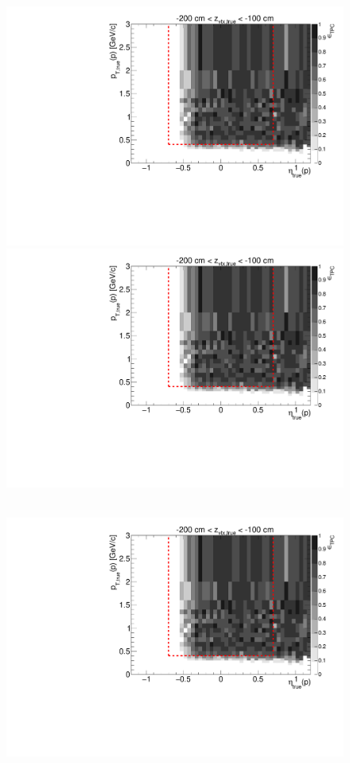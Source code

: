 \begin{figure}[hb]
{  \includegraphics[width=\linewidth,page=7]{graphics/eff/Eff2D_TPC_proton_Plus.pdf}\\
  \includegraphics[width=\linewidth,page=9]{graphics/eff/Eff2D_TPC_proton_Plus.pdf}
}~
\parbox{0.495\textwidth}{
  \centering
  \includegraphics[width=\linewidth,page=4]{graphics/eff/Eff2D_TPC_proton_Plus.pdf}\\
}
\end{figure}
